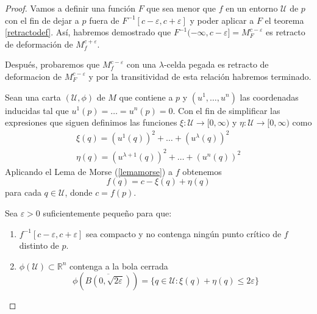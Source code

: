 \begin{proof}
    Vamos a definir una función $F$ que sea menor que $f$ en un entorno $\mathcal{U}$ de $p$ con el fin de dejar a $p$ fuera de $F^{-1}[c-\varepsilon, c+\varepsilon]$ y poder aplicar a $F$ el teorema \ref{retractodef}. Así, habremos demostrado que $F^{-1}(-\infty,c-\varepsilon]=M^{c-\varepsilon}_F$ es retracto de deformación de $M^{c+\varepsilon}_f$.
    
    Después, probaremos que $M^{c-\varepsilon}_f$ con una $\lambda$-celda pegada es retracto de deformacion de $M^{c-\varepsilon}_F$ y por la transitividad de esta relación habremos terminado.

    \bigskip

    Sean una carta $(\mathcal{U}, \phi)$ de $M$ que contiene a $p$ y $(u^1,\dots , u^n)$ las coordenadas inducidas tal que $u^1(p)=\dots=u^{n}(p)=0$. Con el fin de simplificar las expresiones que siguen definimos las funciones $\xi:\mathcal{U}\to [0,\infty)$ y $\eta:\mathcal{U}\to [0,\infty)$ como
    \begin{gather*}
        \xi(q)=(u^1(q))^2+\dots +(u^{\lambda}(q))^2\\
        \eta(q)=(u^{\lambda +1}(q))^2+\dots +(u^{n}(q))^2
    \end{gather*}
    Aplicando el Lema de Morse (\ref{lemamorse}) a $f$ obtenemos
    \begin{equation*}
        f(q) = c - \xi(q) + \eta(q)
    \end{equation*}
    para cada $q\in \mathcal{U}$, donde $c=f(p).$

    Sea $\varepsilon>0$ suficientemente pequeño para que:
    \begin{enumerate}[label=\roman*)]
        \item $f^{-1}[c-\varepsilon,c+\varepsilon]$ sea compacto y no contenga ningún punto crítico de $f$ distinto de $p$.
        \item $\phi(\mathcal{U})\subset \mathbb{R}^n$ contenga a la bola cerrada
        \begin{equation*}
            \phi\left(\overline{B(0, \sqrt{2\varepsilon})}\right)= \{q\in \mathcal{U}: \xi(q)+\eta(q)\le 2\varepsilon\}
        \end{equation*}
    \end{enumerate}


\end{proof}
